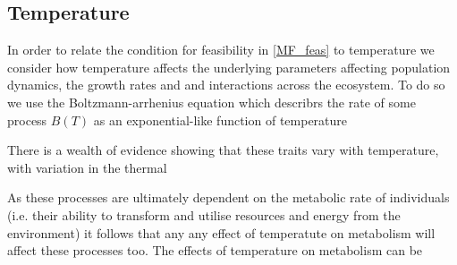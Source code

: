 \documentclass{article}
\begin{document}
\subsection{Temperature}
In order to relate the condition for feasibility in \cref{MF_feas} to temperature we consider how temperature affects the underlying parameters affecting population dynamics, the growth rates and and  interactions across the ecosystem. To do so we use the Boltzmann-arrhenius equation which describrs the rate of some process $B(T)$ as an exponential-like function of temperature 

There is a wealth of evidence showing that these traits vary with temperature, with variation in the thermal 

As these processes are ultimately dependent on the metabolic rate of individuals (i.e. their ability to transform and utilise resources and energy from the environment) it follows that any any effect of temperatute on metabolism will affect these processes too. The effects of temperature on metabolism can be 
\end{document}
